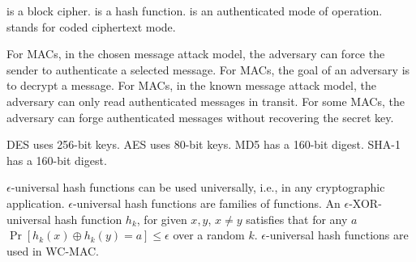 \documentclass[11pt,a4paper]{report}
\begin{document}
	{is a block cipher.}
	{is a hash function.}
	{is an authenticated mode of operation.}
	{stands for coded ciphertext mode.}

	{For MACs, in the chosen message attack model, the adversary can force the
	sender to authenticate a selected message.}
	{For MACs, the goal of an adversary is to decrypt a message.}
	{For MACs, in the known message attack model, the adversary can only read
	authenticated messages in transit.}
	{For some MACs, the adversary can forge authenticated messages without recovering the secret
	key.}


	{DES uses 256-bit keys.}
	{AES uses 80-bit keys.}
	{MD5 has a 160-bit digest.} 
	{SHA-1 has a 160-bit digest.}

 {$\epsilon$-universal hash functions can be used universally, i.e., in any
 cryptographic application.}
 {$\epsilon$-universal hash functions are families of functions.}
 {An $\epsilon$-XOR-universal hash function $h_k$, for given $x,y$, $x \neq
	 y$ satisfies that for any $a$
 $\Pr[h_k(x)\oplus h_k(y) = a] \leq \epsilon$
 over a random $k$.}
 {$\epsilon$-universal hash functions are used in WC-MAC.}
\end{document}
